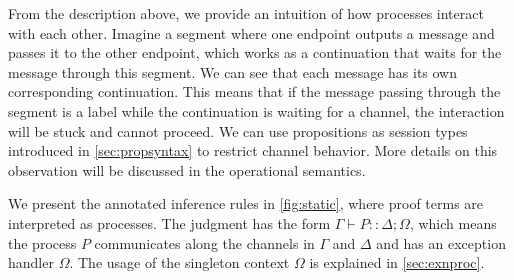 \documentclass[12pt, openany]{memoir}
\newcommand*{\judge}[4]{#1 \vdash #2 :: #3; #4}
\begin{document}
From the description above, we provide an intuition of how processes interact with each other. 
Imagine a segment where one endpoint outputs a message and passes it to the other endpoint, 
which works as a continuation that waits for the message through this segment.
We can see that each message has its own corresponding continuation. 
This means that if the message passing through the segment is a label while the continuation is waiting for a channel, 
the interaction will be stuck and cannot proceed. 
We can use propositions as session types introduced in \cref{sec:propsyntax} to restrict channel behavior. 
More details on this observation will be discussed in the operational semantics.

We present the annotated inference rules in \cref{fig:static}, where proof terms are interpreted as processes. 
The judgment has the form $\judge{\Gamma}{P}{\Delta}{\Omega}$, 
which means the process $P$ communicates along the channels in $\Gamma$ and $\Delta$ and has an exception handler $\Omega$. 
The usage of the singleton context $\Omega$ is explained in \cref{sec:exnproc}.
\end{document}
